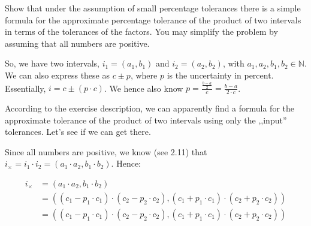 \documentclass{../../sicp}
\date{April 25, 2025}
\begin{document}
\maketitle

\begin{displayquote}
	Show that under the assumption of small percentage tolerances there is a simple formula for the approximate percentage tolerance of the product of two intervals in terms of the tolerances of the factors. You may simplify the problem by assuming that all numbers are positive.
\end{displayquote}

So, we have two intervals, $i_1 = (a_1, b_1)$ and $i_2 = (a_2, b_2)$, with $a_1, a_2, b_1, b_2 \in \mathbb{N}$.
We can also express these as $c \pm p$, where $p$ is the uncertainty in percent.
Essentially, $i = c \pm (p \cdot c)$.
We hence also know $p = \frac{\frac{b - a}{2}}{c} = \frac{b-a}{2 \cdot c}$.

According to the exercise description, we can apparently find a formula for the approximate tolerance of the product of two intervals using only the ,,input'' tolerances.
Let's see if we can get there.

Since all numbers are positive, we know (see 2.11) that $i_{\times} = i_1 \cdot i_2 = (a_1 \cdot a_2, b_1 \cdot b_2)$.
Hence:



\begin{align*}
	i_{\times} & = (a_1 \cdot a_2, b_1 \cdot b_2)                                                                         \\
	           & = ((c_1 - p_1 \cdot c_1) \cdot (c_2 - p_2 \cdot c_2), (c_1 + p_1 \cdot c_1) \cdot (c_2 + p_2 \cdot c_2)) \\
	           & = ((c_1 - p_1 \cdot c_1) \cdot (c_2 - p_2 \cdot c_2), (c_1 + p_1 \cdot c_1) \cdot (c_2 + p_2 \cdot c_2)) \\
\end{align*}
\end{document}
